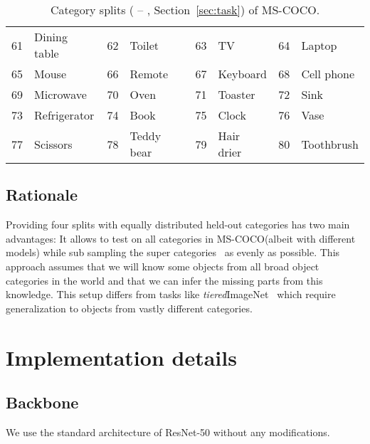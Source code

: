 \documentclass{article}
\newcommand{\coco}{MS-COCO\xspace}
\begin{document}
\begin{table}[h]
\begin{tabular}{rl|rl|rl|rl}
61      & Dining table      & 62     & Toilet            & 63     & TV                & 64     & Laptop            \\
65      & Mouse             & 66     & Remote            & 67     & Keyboard          & 68     & Cell phone        \\
69      & Microwave         & 70     & Oven              & 71     & Toaster           & 72     & Sink              \\
73      & Refrigerator      & 74     & Book              & 75     & Clock             & 76     & Vase              \\
77      & Scissors          & 78     & Teddy bear        & 79     & Hair drier        & 80     & Toothbrush       
\end{tabular}
\caption{Category splits ( -- , Section~\ref{sec:task}) of \coco.}
\label{table:dataset_splits}
\end{table}

\subsection{Rationale}

Providing four splits with equally distributed held-out categories has two main advantages: It allows to test on all categories in \coco (albeit with different models) while sub sampling the super categories~\cite{Lin2014} as evenly as possible. This approach assumes that we will know some objects from all broad object categories in the world and that we can infer the missing parts from this knowledge. This setup differs from tasks like \emph{tiered}ImageNet~\cite{Ren2018} which require generalization to objects from vastly different categories.

\section{Implementation details}
\label{appendix:implementation}

\subsection{Backbone}
We use the standard architecture of ResNet-50 \cite{He2016} without any modifications.
\end{document}
